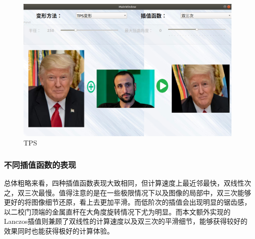\documentclass[UTF8]{ctexart}
\begin{document}
\begin{figure}[H]
    \centering
    \includegraphics[scale=0.3]{../images/report-images/trump.png}
    \caption{TPS}
\end{figure}

\subsubsection{不同插值函数的表现}
总体粗略来看，四种插值函数表现大致相同，但计算速度上最近邻最快，双线性次之，双三次最慢。值得注意的是在一些极限情况下以及图像的局部中，双三次能够更好的将图像细节还原，看上去更加平滑。而低阶次的插值会出现明显的锯齿感，以二校门顶端的金属直杆在大角度旋转情况下尤为明显。而本文额外实现的Lanczos插值则兼顾了双线性的计算速度以及双三次的平滑细节，能够获得较好的效果同时也能获得极好的计算体验。
\end{document}
